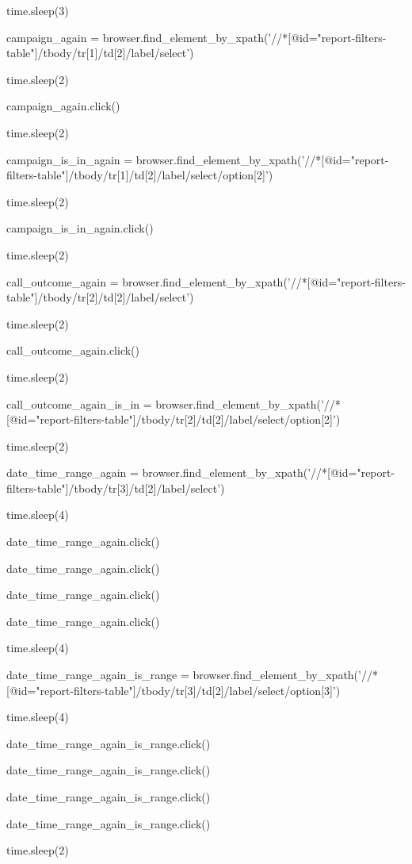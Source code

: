\documentclass[]{article}
\begin{document}
time.sleep(3)

campaign\_again =
browser.find\_element\_by\_xpath('//*{[}@id="report-filters-table"{]}/tbody/tr{[}1{]}/td{[}2{]}/label/select')

time.sleep(2)

campaign\_again.click()

time.sleep(2)

campaign\_is\_in\_again =
browser.find\_element\_by\_xpath('//*{[}@id="report-filters-table"{]}/tbody/tr{[}1{]}/td{[}2{]}/label/select/option{[}2{]}')

time.sleep(2)

campaign\_is\_in\_again.click()

time.sleep(2)

call\_outcome\_again =
browser.find\_element\_by\_xpath('//*{[}@id="report-filters-table"{]}/tbody/tr{[}2{]}/td{[}2{]}/label/select')

time.sleep(2)

call\_outcome\_again.click()

time.sleep(2)

call\_outcome\_again\_is\_in =
browser.find\_element\_by\_xpath('//*{[}@id="report-filters-table"{]}/tbody/tr{[}2{]}/td{[}2{]}/label/select/option{[}2{]}')

time.sleep(2)

date\_time\_range\_again =
browser.find\_element\_by\_xpath('//*{[}@id="report-filters-table"{]}/tbody/tr{[}3{]}/td{[}2{]}/label/select')

time.sleep(4)

date\_time\_range\_again.click()

date\_time\_range\_again.click()

date\_time\_range\_again.click()

date\_time\_range\_again.click()

time.sleep(4)

date\_time\_range\_again\_is\_range =
browser.find\_element\_by\_xpath('//*{[}@id="report-filters-table"{]}/tbody/tr{[}3{]}/td{[}2{]}/label/select/option{[}3{]}')

time.sleep(4)

date\_time\_range\_again\_is\_range.click()

date\_time\_range\_again\_is\_range.click()

date\_time\_range\_again\_is\_range.click()

date\_time\_range\_again\_is\_range.click()

time.sleep(2)
\end{document}
